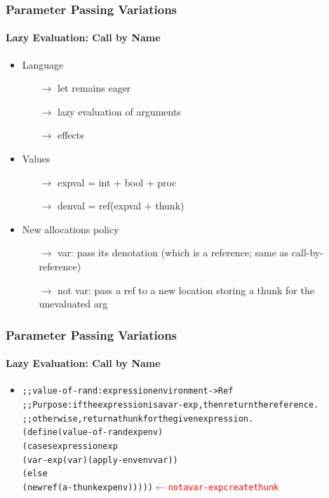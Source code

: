 \documentclass{beamer}
\newcommand{\arrow}{\(\rightarrow\)}
\begin{document}
\begin{frame}[fragile]
\frametitle{Parameter Passing Variations}
\framesubtitle{Lazy Evaluation: Call by Name}
\begin{scriptsize}
\begin{itemize}

\item<1-> Language
\begin{itemize}
  \item[\arrow] let remains eager
  \item[\arrow] lazy evaluation of arguments
  \item[\arrow] effects
\end{itemize}

\item<2-> Values
\begin{itemize}
  \item[\arrow] expval = int + bool + proc
  \item[\arrow] denval = ref(expval + thunk)
\end{itemize}

\item<3-> New allocations policy
\begin{itemize}
  \item[\arrow] var: pass its denotation (which is a reference; same as call-by-reference)
  \item[\arrow] not var: pass a ref to a new location storing a thunk for the unevaluated arg
\end{itemize}

\end{itemize}
\end{scriptsize}
\end{frame}

\begin{frame}[fragile]
\frametitle{Parameter Passing Variations}
\framesubtitle{Lazy Evaluation: Call by Name}
\begin{scriptsize}
\begin{itemize}
\item<1-> 
\begin{alltt}
;; value-of-rand : expression environment -> Ref
;; Purpose: if the expression is a var-exp, then return the reference.
;; otherwise,return a thunk for the given expression.
(define (value-of-rand exp env)
  (cases expression exp
    (var-exp (var) (apply-env env var))
    (else
     (newref (a-thunk exp env))))) \textcolor{red}{\(\leftarrow\) not a var-exp create thunk}
\end{alltt}

\end{itemize}
\end{scriptsize}
\end{frame}
\end{document}
